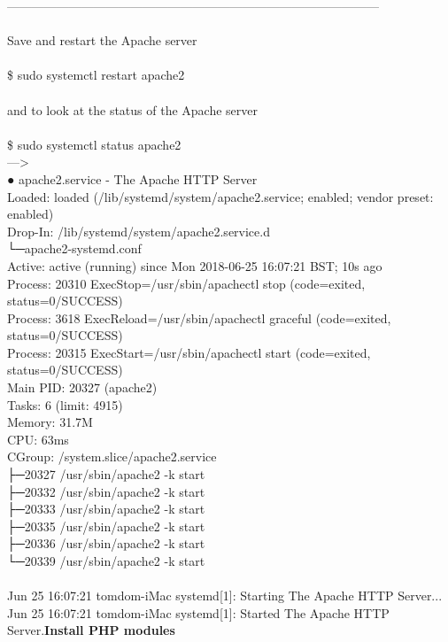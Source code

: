 \documentclass[10pt,a4paper]{article}
\begin{document}
{{{{{{{{{{{{{{{{{{------------------------------------------------------------------------------------------\\
\\
Save and restart the Apache server\\
\\
\$ sudo systemctl restart apache2\\
\\
and to look at the status of the Apache server\\
\\
\$ sudo systemctl status apache2\\
--->\\
}● apache2.service - The Apache HTTP Server\\
   Loaded: loaded (/lib/systemd/system/apache2.service; enabled; vendor preset: enabled)\\
  Drop-In: /lib/systemd/system/apache2.service.d\\
           └─apache2-systemd.conf\\
   Active: active (running) since Mon 2018-06-25 16:07:21 BST; 10s ago\\
  Process: 20310 ExecStop=/usr/sbin/apachectl stop (code=exited, status=0/SUCCESS)\\
  Process: 3618 ExecReload=/usr/sbin/apachectl graceful (code=exited, status=0/SUCCESS)\\
  Process: 20315 ExecStart=/usr/sbin/apachectl start (code=exited, status=0/SUCCESS)\\
 Main PID: 20327 (apache2)\\
    Tasks: 6 (limit: 4915)\\
   Memory: 31.7M\\
      CPU: 63ms\\
   CGroup: /system.slice/apache2.service\\
           ├─20327 /usr/sbin/apache2 -k start\\
           ├─20332 /usr/sbin/apache2 -k start\\
           ├─20333 /usr/sbin/apache2 -k start\\
           ├─20335 /usr/sbin/apache2 -k start\\
           ├─20336 /usr/sbin/apache2 -k start\\
           └─20339 /usr/sbin/apache2 -k start\\
\\
Jun 25 16:07:21 tomdom-iMac systemd[1]: Starting The Apache HTTP Server...\\
Jun 25 16:07:21 tomdom-iMac systemd[1]: Started The Apache HTTP Server.{\large \textbf{Install PHP modules}}{\large \\
}}}}}}}}}}}}}}}}}}
\end{document}
